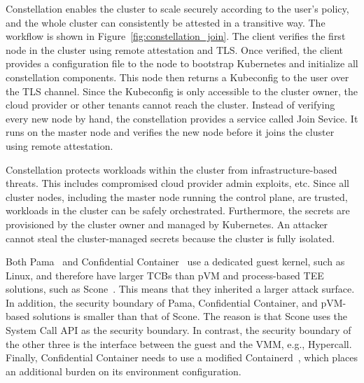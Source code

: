 Constellation enables the cluster to scale securely according to the user's policy, and the whole cluster can consistently be attested in a transitive way. The workflow is shown in Figure~\ref{fig:constellation_join}. The client verifies the first node in the cluster using remote attestation and TLS. 
Once verified, the client provides a configuration file to the node to bootstrap Kubernetes and initialize all constellation components. This node then returns a Kubeconfig to the user over the TLS channel. Since the Kubeconfig is only accessible to the cluster owner, the cloud provider or other tenants 
cannot reach the cluster. Instead of verifying every new node by hand, the constellation provides a service called Join Sevice. It runs on the master node and verifies the new node before it joins the cluster using remote attestation.

Constellation protects workloads within the cluster from infrastructure-based threats. This includes compromised cloud provider admin exploits, etc. Since all cluster nodes, including the master node running the control plane, are trusted, workloads in the cluster can be safely orchestrated. 
Furthermore, the secrets are provisioned by the cluster owner and managed by Kubernetes. An attacker cannot steal the cluster-managed secrets because the cluster is fully isolated.
 
 
Both Pama~\cite*{Johnson2023ParmaCC} and Confidential Container~\cite*{confidential_kata} use a dedicated guest kernel, such as Linux, and therefore have larger TCBs than pVM and process-based TEE solutions, such as Scone~\cite*{10.5555/3026877.3026930}. This means that they inherited a larger attack 
surface. In addition, the security boundary of Pama, Confidential Container, and pVM-based solutions is smaller than that of Scone. The reason is that Scone uses the System Call API as the security boundary. In contrast, the security boundary of the other three is the interface between the guest and the VMM, e.g., 
Hypercall. Finally, Confidential Container needs to use a modified Containerd~\cite*{containerd}, which places an additional burden on its environment configuration. 



\cleardoublepage

